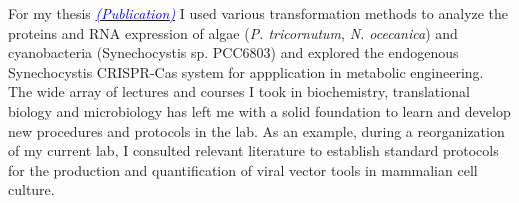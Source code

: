 \documentclass[11pt,a4paper,sans]{moderncv}
\begin{document}
\begin{spacing}{1.15}
For my thesis {\href{https://www.ncbi.nlm.nih.gov/pubmed/29517395}{\textcolor{blue}{{\textit{(Publication)}}}}} I used various transformation methods to analyze the proteins and RNA expression of algae (\textit{P. tricornutum}, \textit{N. ocecanica}) and cyanobacteria (Synechocystis sp. PCC6803) and explored the endogenous Synechocystis CRISPR-Cas system for appplication in metabolic engineering.
The wide array of lectures and courses I took in biochemistry, translational biology and microbiology has left me with a solid foundation to learn and develop new procedures and protocols in the lab. %
As an example, during a reorganization of my current lab, I consulted relevant literature to establish standard protocols for the production and quantification of viral vector tools in mammalian cell culture. %

\end{spacing}
\end{document}
